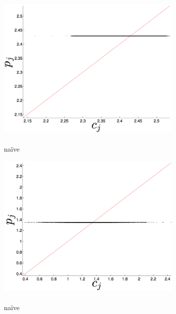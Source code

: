 \begin{figure}[htbp]
  \centering
      \begin{subfigure}{0.33\columnwidth}
    \includegraphics[width=\columnwidth]{figs/colMeanForecast.png}
    \caption{\col\\ na\"ive }
    \label{fig:gccMEAN}
  \end{subfigure}%
   \begin{subfigure}{0.32\columnwidth}
    \includegraphics[width=\columnwidth]{figs/gccMeanForecast.png}
    \caption{\gcc\\ na\"ive }
    \label{fig:gccMEAN}
  \end{subfigure}%
     \begin{subfigure}{0.32\columnwidth}

\end{subfigure}
\end{figure}
